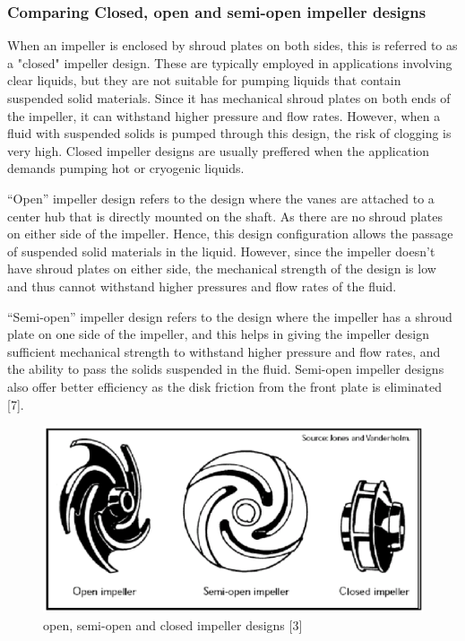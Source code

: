 \documentclass[11pt,a4paper]{scrartcl}
\begin{document}
\subsubsection{Comparing Closed, open and semi-open impeller designs}
When an impeller is enclosed by shroud plates on both sides, this is referred to as a "closed" impeller design. These are typically employed in applications involving clear liquids, but they are not suitable for pumping liquids that contain suspended solid materials. Since it has mechanical shroud plates on both ends of the impeller, it can withstand higher pressure and flow rates. However, when a fluid with suspended solids is pumped through this design, the risk of clogging is very high. Closed impeller designs are usually preffered when the application demands pumping hot or cryogenic liquids.\par

“Open” impeller design refers to the design where the vanes are attached to a center hub that is directly mounted on the shaft. As there are no shroud plates on either side of the impeller. Hence, this design configuration allows the passage of suspended solid materials in the liquid. However, since the impeller doesn’t have shroud plates on either side, the mechanical strength of the design is low and thus cannot withstand higher pressures and flow rates of the fluid.\par

“Semi-open” impeller design refers to the design where the impeller has a shroud plate on one side of the impeller, and this helps in giving the impeller design sufficient mechanical strength to withstand higher pressure and flow rates, and the ability to pass the solids suspended in the fluid. Semi-open impeller designs also offer better efficiency as the disk friction from the front plate is eliminated [7].

\begin{figure}[h]
    \centering
    \includegraphics[scale=0.8]{image2.png}
    \caption{open, semi-open and closed impeller designs [3]}
   
    \label{fig:image2}
    
\end{figure}
\end{document}

